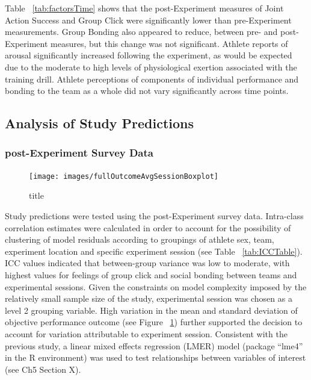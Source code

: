 

Table ~\ref{tab:factorsTime} shows that the post-Experiment measures of Joint Action Success and Group Click were significantly lower than pre-Experiment measurements.  Group Bonding also appeared to reduce, between pre- and post-Experiment measures,  but this change was not significant.  Athlete reports of arousal significantly increased following the experiment, as would be expected due to the moderate to high levels of physiological exertion associated with the training drill.  Athlete perceptions of components of individual performance and bonding to the team as a whole did not vary significantly across time points.








\subsection{Analysis of Study Predictions}



\subsubsection{post-Experiment Survey Data}



\begin{figure}
  \centering
  \texttt{[image: images/fullOutcomeAvgSessionBoxplot]}
  \label{fig:fullOutcomeAvgSessionBoxplot}
  \caption{title}
\end{figure}


Study predictions were tested using the post-Experiment survey data.  Intra-class correlation estimates were calculated in order to account for the possibility of clustering of model residuals according to groupings of athlete sex, team, experiment location and specific experiment session (see Table ~\ref{tab:ICCTable}). ICC values indicated that between-group variance was low to moderate, with highest values for feelings of group click and social bonding between teams and experimental sessions. Given the constraints on model complexity imposed by the relatively small sample size of the study, experimental session was chosen as a level 2 grouping variable. High variation in the mean and standard deviation of objective performance outcome (see Figure ~\ref{fig:fullOutcomeAvgSessionBoxplot}) further supported the decision to account for variation attributable to experiment session. Consistent with the previous study, a linear mixed effects regression (LMER) model (package ``lme4'' in the R environment) was used to test relationships between variables of interest (see Ch5 Section X).



